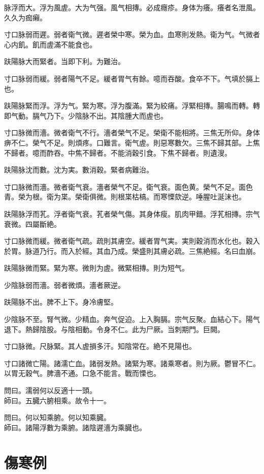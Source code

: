 \documentclass[12pt,twoside,UTF8,b5paper]{ctexbook}
\begin{document}
脉浮而大。浮为風虗。大为气强。風气相摶。必成癮疹。身体为癢。癢者名泄風。久久为痂癩。

寸口脉弱而遲。弱者衛气微。遲者榮中寒。榮为血。血寒則发熱。衛为气。气微者心内飢。飢而虗滿不能食也。

趺陽脉大而緊者。当即下利。为難治。

寸口脉弱而緩。弱者陽气不足。緩者胃气有餘。噫而吞酸。食卒不下。气填於膈上也。

趺陽脉緊而浮。浮为气。緊为寒。浮为腹滿。緊为絞痛。浮緊相摶。腸鳴而轉。轉即气動。膈气乃下。少陰脉不出。其陰腫大而虗也。

寸口脉微而濇。微者衛气不行。濇者榮气不足。榮衛不能相將。三焦无所仰。身体痹不仁。榮气不足。則煩疼。口難言。衛气虗。則惡寒數欠。三焦不歸其部。上焦不歸者。噫而酢吞。中焦不歸者。不能消穀引食。下焦不歸者。則遺溲。

趺陽脉沈而數。沈为実。數消穀。緊者病難治。

寸口脉微而濇。微者衛气衰。濇者榮气不足。衛气衰。面色黄。榮气不足。面色青。榮为根。衛为枼。榮衛俱微。則根枼枯槁。而寒慄欬逆。唾腥吐涎沫也。

趺陽脉浮而芤。浮者衛气衰。芤者榮气傷。其身体瘦。肌肉甲錯。浮芤相摶。宗气衰微。四屬斷絶。

寸口脉微而緩。微者衛气疏。疏則其膚空。緩者胃气実。実則穀消而水化也。穀入於胃。脉道乃行。而入於經。其血乃成。榮盛則其膚必疏。三焦絶經。名曰血崩。

趺陽脉微而緊。緊为寒。微則为虗。微緊相摶。則为短气。

少陰脉弱而濇。弱者微煩。濇者厥逆。

趺陽脉不出。脾不上下。身冷膚堅。

少陰脉不至。腎气微。少精血。奔气促迫。上入胸膈。宗气反聚。血結心下。陽气退下。熱歸陰股。与陰相動。令身不仁。此为尸厥。当刺期門。巨闕。

寸口脉微。尺脉緊。其人虗損多汗。知陰常在。絶不見陽也。

寸口諸微亡陽。諸濡亡血。諸弱发熱。諸緊为寒。諸乘寒者。則为厥。鬱冒不仁。以胃无穀气。脾濇不通。口急不能言。戰而慄也。

問曰。濡弱何以反適十一頭。\\
師曰。五臓六腑相乘。故令十一。

問曰。何以知乘腑。何以知乘臓。\\
師曰。諸陽浮數为乘腑。諸陰遲濇为乘臓也。

\chapter{傷寒例}
\end{document}
